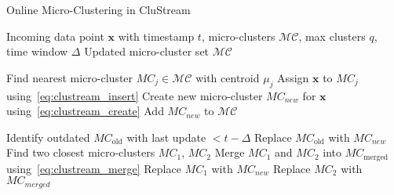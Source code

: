 \begin{algorithm}[h]
    \caption{Online Micro-Clustering in CluStream}
    \label{alg:clustream}
    \begin{algorithmic}[1]
        \REQUIRE Incoming data point $\mathbf{x}$ with timestamp $t$, micro-clusters $\mathcal{MC}$, max clusters $q$, time window $\Delta$
        \ENSURE Updated micro-cluster set $\mathcal{MC}$

        \STATE Find nearest micro-cluster $MC_j \in \mathcal{MC}$ with centroid $\mu_j$
        \STATE Assign $\mathbf{x}$ to $MC_j$ using~\ref{eq:clustream_insert}
        \ELSE
        \STATE Create new micro-cluster $MC_{new}$ for $\mathbf{x}$ using~\ref{eq:clustream_create}
        \STATE Add $MC_{new}$ to $\mathcal{MC}$
        
        \ELSE
        \STATE Identify outdated $MC_{\text{old}}$ with last update $< t - \Delta$
        \STATE Replace $MC_{\text{old}}$ with $MC_{new}$
        \ELSE
        \STATE Find two closest micro-clusters $MC_1$, $MC_2$
        \STATE Merge $MC_1$ and $MC_2$ into $MC_{\text{merged}}$ using~\ref{eq:clustream_merge}
        \STATE Replace $MC_1$ with $MC_{new}$
        \STATE Replace $MC_2$ with $MC_{merged}$
        \ENDIF
        \ENDIF
        \ENDIF
    \end{algorithmic}
\end{algorithm}
